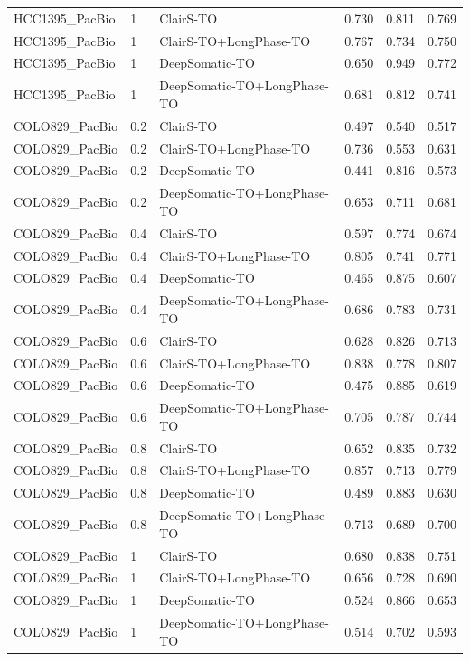 \documentclass[pdflatex,sn-nature]{sn-jnl}
\begin{document}
{\begin{longtable}{@{}lllccc@{}}
  HCC1395\_PacBio & 1 & ClairS-TO & 0.730 & 0.811 & 0.769 \\
  HCC1395\_PacBio & 1 & ClairS-TO+LongPhase-TO & 0.767 & 0.734 & 0.750 \\
  HCC1395\_PacBio & 1 & DeepSomatic-TO & 0.650 & 0.949 & 0.772 \\
  HCC1395\_PacBio & 1 & DeepSomatic-TO+LongPhase-TO & 0.681 & 0.812 & 0.741 \\
  \addlinespace
  COLO829\_PacBio & 0.2 & ClairS-TO & 0.497 & 0.540 & 0.517 \\
  COLO829\_PacBio & 0.2 & ClairS-TO+LongPhase-TO & 0.736 & 0.553 & 0.631 \\
  COLO829\_PacBio & 0.2 & DeepSomatic-TO & 0.441 & 0.816 & 0.573 \\
  COLO829\_PacBio & 0.2 & DeepSomatic-TO+LongPhase-TO & 0.653 & 0.711 & 0.681 \\
  COLO829\_PacBio & 0.4 & ClairS-TO & 0.597 & 0.774 & 0.674 \\
  COLO829\_PacBio & 0.4 & ClairS-TO+LongPhase-TO & 0.805 & 0.741 & 0.771 \\
  COLO829\_PacBio & 0.4 & DeepSomatic-TO & 0.465 & 0.875 & 0.607 \\
  COLO829\_PacBio & 0.4 & DeepSomatic-TO+LongPhase-TO & 0.686 & 0.783 & 0.731 \\
  COLO829\_PacBio & 0.6 & ClairS-TO & 0.628 & 0.826 & 0.713 \\
  COLO829\_PacBio & 0.6 & ClairS-TO+LongPhase-TO & 0.838 & 0.778 & 0.807 \\
  COLO829\_PacBio & 0.6 & DeepSomatic-TO & 0.475 & 0.885 & 0.619 \\
  COLO829\_PacBio & 0.6 & DeepSomatic-TO+LongPhase-TO & 0.705 & 0.787 & 0.744 \\
  COLO829\_PacBio & 0.8 & ClairS-TO & 0.652 & 0.835 & 0.732 \\
  COLO829\_PacBio & 0.8 & ClairS-TO+LongPhase-TO & 0.857 & 0.713 & 0.779 \\
  COLO829\_PacBio & 0.8 & DeepSomatic-TO & 0.489 & 0.883 & 0.630 \\
  COLO829\_PacBio & 0.8 & DeepSomatic-TO+LongPhase-TO & 0.713 & 0.689 & 0.700 \\
  COLO829\_PacBio & 1 & ClairS-TO & 0.680 & 0.838 & 0.751 \\
  COLO829\_PacBio & 1 & ClairS-TO+LongPhase-TO & 0.656 & 0.728 & 0.690 \\
  COLO829\_PacBio & 1 & DeepSomatic-TO & 0.524 & 0.866 & 0.653 \\
  COLO829\_PacBio & 1 & DeepSomatic-TO+LongPhase-TO & 0.514 & 0.702 & 0.593 \\

\end{longtable}}
\end{document}
